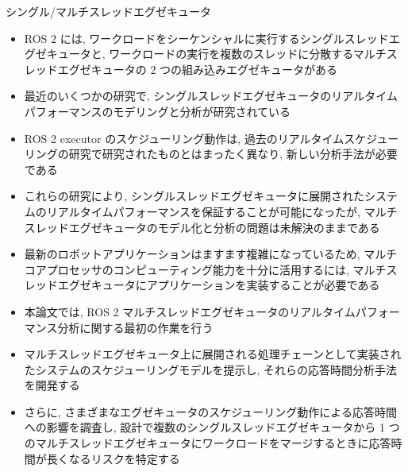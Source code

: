 \begin{frame}{シングル/マルチスレッドエグゼキュータ}
    \begin{itemize}
        \item ROS 2 には, ワークロードをシーケンシャルに実行するシングルスレッドエグゼキュータと, ワークロードの実行を複数のスレッドに分散するマルチスレッドエグゼキュータの 2 つの組み込みエグゼキュータがある
        \item 最近のいくつかの研究で, シングルスレッドエグゼキュータのリアルタイムパフォーマンスのモデリングと分析が研究されている
        \item ROS 2 executor のスケジューリング動作は, 過去のリアルタイムスケジューリングの研究で研究されたものとはまったく異なり, 新しい分析手法が必要である
        \item これらの研究により, シングルスレッドエグゼキュータに展開されたシステムのリアルタイムパフォーマンスを保証することが可能になったが, マルチスレッドエグゼキュータのモデル化と分析の問題は未解決のままである
    \end{itemize}
\end{frame}

\begin{frame}{}
    \begin{itemize}
        \item 最新のロボットアプリケーションはますます複雑になっているため, マルチコアプロセッサのコンピューティング能力を十分に活用するには, マルチスレッドエグゼキュータにアプリケーションを実装することが必要である
        \item 本論文では, ROS 2 マルチスレッドエグゼキュータのリアルタイムパフォーマンス分析に関する最初の作業を行う
        \item マルチスレッドエグゼキュータ上に展開される処理チェーンとして実装されたシステムのスケジューリングモデルを提示し, それらの応答時間分析手法を開発する
        \item さらに, さまざまなエグゼキュータのスケジューリング動作による応答時間への影響を調査し, 設計で複数のシングルスレッドエグゼキュータから 1 つのマルチスレッドエグゼキュータにワークロードをマージするときに応答時間が長くなるリスクを特定する
    \end{itemize}
\end{frame}
